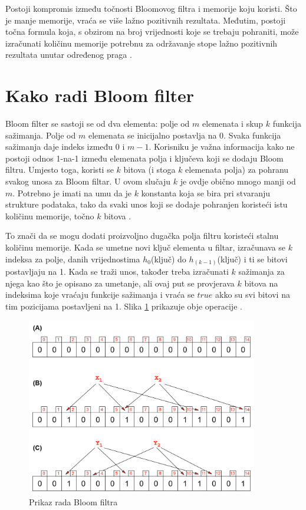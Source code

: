 \documentclass{foi}
\begin{document}
Postoji kompromis između točnosti Bloomovog filtra i memorije koju koristi. Što je manje memorije, vraća se više lažno pozitivnih rezultata. Međutim, postoji točna formula koja, s obzirom na broj vrijednosti koje se trebaju pohraniti, može izračunati količinu memorije potrebnu za održavanje stope lažno pozitivnih rezultata unutar određenog praga \cite{la2021advanced}.

\section{Kako radi Bloom filter}
Bloom filter se sastoji se od dva elementa: polje od $m$ elemenata i skup $k$ funkcija sažimanja. Polje od $m$ elemenata se inicijalno postavlja na 0. Svaka funkcija sažimanja daje indeks između $0$ i $m-1$. Korisniku je važna informacija kako ne postoji odnos 1-na-1 između elemenata polja i ključeva koji se dodaju Bloom filtru. Umjesto toga, koristi se $k$ bitova (i stoga $k$ elemenata polja) za pohranu svakog unosa za Bloom filtar. U ovom slučaju $k$ je ovdje obično mnogo manji od $m$. Potrebno je imati na umu da je $k$ konstanta koja se bira pri stvaranju strukture podataka, tako da svaki unos koji se dodaje pohranjen koristeći istu količinu memorije, točno $k$ bitova \cite{la2021advanced}.

To znači da se mogu dodati proizvoljno dugačka polja filtru koristeći stalnu količinu memorije. Kada se umetne novi ključ elementa u filtar, izračunava se $k$ indeksa za polje, danih vrijednostima $h_0$(ključ) do $h_{(k-1)}$(ključ) i ti se bitovi postavljaju na 1. Kada se traži unos, također treba izračunati $k$ sažimanja za njega kao što je opisano za umetanje, ali ovaj put se provjerava $k$ bitova na indeksima koje vraćaju funkcije sažimanja i vraća se $true$ akko su svi bitovi na tim pozicijama postavljeni na 1. Slika \ref{fig:vremena2} prikazuje obje operacije \cite{la2021advanced}.

\begin{figure}[H]
    \centering
    \includegraphics[width=0.9\textwidth, frame]{slike/input.png}
    \caption{Prikaz rada Bloom filtra \cite{la2021advanced}}
    \label{fig:vremena2}
\end{figure}
\end{document}
